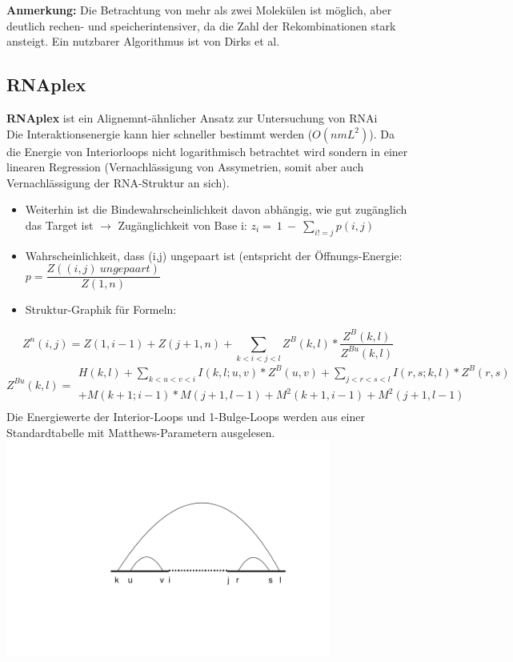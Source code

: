 \textbf{Anmerkung:} Die Betrachtung von mehr als zwei Molekülen ist möglich, aber deutlich rechen- und speicherintensiver, da die Zahl der Rekombinationen stark ansteigt. Ein nutzbarer Algorithmus ist von Dirks et al. 

\subsection{RNAplex}

\textbf{RNAplex} ist ein Alignemnt-ähnlicher Ansatz zur Untersuchung   von RNAi \\
Die Interaktionsenergie kann hier schneller bestimmt werden ($O(nmL^2)$). Da die Energie von Interiorloops nicht logarithmisch betrachtet wird sondern in einer linearen Regression (Vernachlässigung von Assymetrien, somit aber auch Vernachlässigung der RNA-Struktur an sich).
\begin{itemize}
\item Weiterhin ist die Bindewahrscheinlichkeit davon abhängig, wie gut zugänglich das Target ist $\rightarrow$ Zugänglichkeit von Base i: $ z_i =\ 1\ -\ \displaystyle\sum_{i != j} p(i,j)$
\item Wahrscheinlichkeit, dass (i,j) ungepaart ist (entspricht der Öffnungs-Energie: 
$p = \dfrac{Z((i,j)\ ungepaart)}{Z(1,n)}$ 
\item Struktur-Graphik für Formeln:
\end{itemize}
\begin{equation}
Z^n(i,j) = Z(1,i-1) + Z(j+1,n) + 
\displaystyle\sum_{k<i<j<l} Z^B(k,l) 
* \dfrac{Z^{B}(k,l)}{Z^{Bu}(k,l)}
\end{equation}
\begin{equation}
Z^{Bu}(k,l) =
\begin{split} H(k,l) + \displaystyle\sum_{k<u<v<i} I(k,l;u,v) * Z^B(u,v) +\displaystyle\sum_{j<r<s<l} I(r,s;k,l) * Z^B(r,s) \\
+ M(k+1;i-1)*M(j+1,l-1)+M^2(k+1,i-1)+ M^2(j+1,l-1) \\
\end{split}
\end{equation}
Die Energiewerte der Interior-Loops und 1-Bulge-Loops werden aus einer Standardtabelle mit Matthews-Parametern ausgelesen.\\ \includegraphics[width=0.8\textwidth]{lectures/160509/pix/RNAplex_Abb.pdf}
